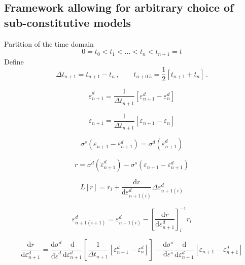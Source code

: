 \documentclass[12pt]{article}
\newcommand{\der}[2]{\dfrac{\text{d} #1}{\text{d} #2}}
\begin{document}
\subsection{Framework allowing for arbitrary choice of sub-constitutive models}

Partition of the time domain
\begin{equation}
	0 = t_{0} < t_{1} < ... < t_{n} < t_{n+1} = t
\end{equation}
Define
\begin{equation}
	\Delta t_{n+1} = t_{n+1} - t_{n}\,, \qquad t_{n+0.5} = \dfrac{1}{2}\left[t_{n+1} + t_{n}\right]\,.
\end{equation}

\begin{equation}
	\dot{\varepsilon}_{n+1}^{d} = \dfrac{1}{\Delta t_{n+1}}\left[\varepsilon_{n+1}^{d} - \varepsilon_{n}^{d}\right]
\end{equation}

\begin{equation}
	\dot{\varepsilon}_{n+1} = \dfrac{1}{\Delta t_{n+1}}\left[\varepsilon_{n+1} - \varepsilon_{n}\right]
\end{equation}

\begin{equation}
	\sigma^{s}(\varepsilon_{n+1} - \varepsilon_{n+1}^{d}) = \sigma^{d}\left(\dot{\varepsilon}_{n+1}^{d}\right)
\end{equation}

\begin{equation}
		r = \sigma^{d}\left(\dot{\varepsilon}_{n+1}^{d}\right) - \sigma^{s}(\varepsilon_{n+1} - \varepsilon_{n+1}^{d})  
\end{equation}

\begin{equation}
	L[r] = r_{i} + \der{r}{\varepsilon_{n+1(i)}^{d}} \Delta \varepsilon_{n+1(i)}^{d}
\end{equation}

\begin{equation}
	\varepsilon_{n+1(i+1)}^{d} = 	\varepsilon_{n+1(i)}^{d} - \left[\der{r}{\varepsilon_{n+1}^{d}}\right]_{i}^{-1}r_{i}
\end{equation}

\begin{equation}
	\der{r}{\varepsilon_{n+1}^{d}} = \der{\sigma^{d}}{\dot{\varepsilon}^{d}}\der{ }{\varepsilon_{n+1}^{d} }\left[ \dfrac{1}{\Delta t_{n+1}}\left[\varepsilon_{n+1}^{d} - \varepsilon_{n}^{d}\right]\right] - \der{\sigma^{s}}{\varepsilon^{s}}\der{ }{\varepsilon_{n+1}^{d}}\left[\varepsilon_{n+1} - \varepsilon_{n+1}^{d}\right]
\end{equation}
\end{document}
